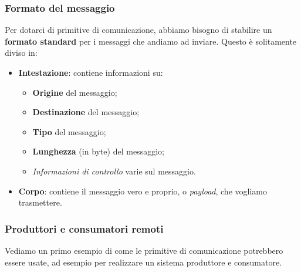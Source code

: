 \documentclass[a4paper,11pt]{article}
\begin{document}
\subsubsection{Formato del messaggio}
Per dotarci di primitive di comunicazione, abbiamo bisogno di stabilire un \textbf{formato standard} per i messaggi che andiamo ad inviare.
Questo è solitamente diviso in:
\begin{itemize}
	\item \textbf{Intestazione}: contiene informazioni su:
		\begin{itemize}
			\item \textbf{Origine} del messaggio;
			\item \textbf{Destinazione} del messaggio;
			\item \textbf{Tipo} del messaggio;
			\item \textbf{Lunghezza} (in byte) del messaggio;
			\item \textit{Informazioni di controllo} varie sul messaggio.
		\end{itemize}
	\item \textbf{Corpo}: contiene il messaggio vero e proprio, o \textit{payload}, che vogliamo trasmettere.
\end{itemize}

\subsubsection{Produttori e consumatori remoti}
Vediamo un primo esempio di come le primitive di comunicazione potrebbero essere usate, ad esempio per realizzare un sistema produttore e consumatore.
\end{document}
